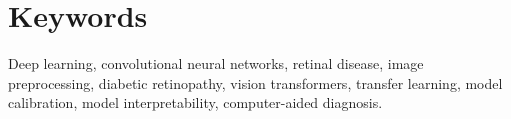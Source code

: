 \chapter*{Keywords}
Deep learning, convolutional neural networks, retinal disease, image preprocessing, diabetic retinopathy, vision transformers, transfer learning, model calibration, model interpretability, computer-aided diagnosis.